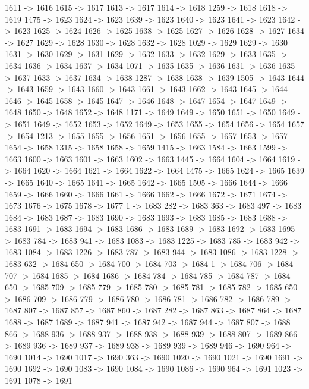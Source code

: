 {	1611 -> 1616
	1615 -> 1617
	1613 -> 1617
	1614 -> 1618
	1259 -> 1618
	1618 -> 1619
	1475 -> 1623
	1624 -> 1623
	1639 -> 1623
	1640 -> 1623
	1641 -> 1623
	1642 -> 1623
	1625 -> 1624
	1626 -> 1625
	1638 -> 1625
	1627 -> 1626
	1628 -> 1627
	1634 -> 1627
	1629 -> 1628
	1630 -> 1628
	1632 -> 1628
	1029 -> 1629
	1629 -> 1630
	1631 -> 1630
	1629 -> 1631
	1629 -> 1632
	1633 -> 1632
	1629 -> 1633
	1635 -> 1634
	1636 -> 1634
	1637 -> 1634
	1071 -> 1635
	1635 -> 1636
	1631 -> 1636
	1635 -> 1637
	1633 -> 1637
	1634 -> 1638
	1287 -> 1638
	1638 -> 1639
	1505 -> 1643
	1644 -> 1643
	1659 -> 1643
	1660 -> 1643
	1661 -> 1643
	1662 -> 1643
	1645 -> 1644
	1646 -> 1645
	1658 -> 1645
	1647 -> 1646
	1648 -> 1647
	1654 -> 1647
	1649 -> 1648
	1650 -> 1648
	1652 -> 1648
	1171 -> 1649
	1649 -> 1650
	1651 -> 1650
	1649 -> 1651
	1649 -> 1652
	1653 -> 1652
	1649 -> 1653
	1655 -> 1654
	1656 -> 1654
	1657 -> 1654
	1213 -> 1655
	1655 -> 1656
	1651 -> 1656
	1655 -> 1657
	1653 -> 1657
	1654 -> 1658
	1315 -> 1658
	1658 -> 1659
	1415 -> 1663
	1584 -> 1663
	1599 -> 1663
	1600 -> 1663
	1601 -> 1663
	1602 -> 1663
	1445 -> 1664
	1604 -> 1664
	1619 -> 1664
	1620 -> 1664
	1621 -> 1664
	1622 -> 1664
	1475 -> 1665
	1624 -> 1665
	1639 -> 1665
	1640 -> 1665
	1641 -> 1665
	1642 -> 1665
	1505 -> 1666
	1644 -> 1666
	1659 -> 1666
	1660 -> 1666
	1661 -> 1666
	1662 -> 1666
	1672 -> 1671
	1674 -> 1673
	1676 -> 1675
	1678 -> 1677
	1 -> 1683
	282 -> 1683
	363 -> 1683
	497 -> 1683
	1684 -> 1683
	1687 -> 1683
	1690 -> 1683
	1693 -> 1683
	1685 -> 1683
	1688 -> 1683
	1691 -> 1683
	1694 -> 1683
	1686 -> 1683
	1689 -> 1683
	1692 -> 1683
	1695 -> 1683
	784 -> 1683
	941 -> 1683
	1083 -> 1683
	1225 -> 1683
	785 -> 1683
	942 -> 1683
	1084 -> 1683
	1226 -> 1683
	787 -> 1683
	944 -> 1683
	1086 -> 1683
	1228 -> 1683
	632 -> 1684
	650 -> 1684
	700 -> 1684
	703 -> 1684
	1 -> 1684
	706 -> 1684
	707 -> 1684
	1685 -> 1684
	1686 -> 1684
	784 -> 1684
	785 -> 1684
	787 -> 1684
	650 -> 1685
	709 -> 1685
	779 -> 1685
	780 -> 1685
	781 -> 1685
	782 -> 1685
	650 -> 1686
	709 -> 1686
	779 -> 1686
	780 -> 1686
	781 -> 1686
	782 -> 1686
	789 -> 1687
	807 -> 1687
	857 -> 1687
	860 -> 1687
	282 -> 1687
	863 -> 1687
	864 -> 1687
	1688 -> 1687
	1689 -> 1687
	941 -> 1687
	942 -> 1687
	944 -> 1687
	807 -> 1688
	866 -> 1688
	936 -> 1688
	937 -> 1688
	938 -> 1688
	939 -> 1688
	807 -> 1689
	866 -> 1689
	936 -> 1689
	937 -> 1689
	938 -> 1689
	939 -> 1689
	946 -> 1690
	964 -> 1690
	1014 -> 1690
	1017 -> 1690
	363 -> 1690
	1020 -> 1690
	1021 -> 1690
	1691 -> 1690
	1692 -> 1690
	1083 -> 1690
	1084 -> 1690
	1086 -> 1690
	964 -> 1691
	1023 -> 1691
	1078 -> 1691
}
